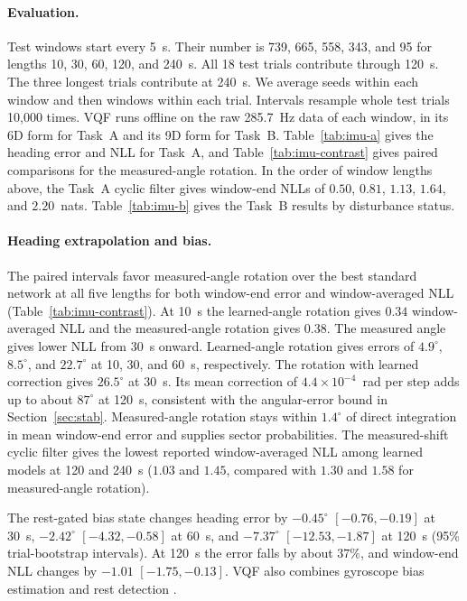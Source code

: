 \paragraph{Evaluation.}
Test windows start every 5~s. Their number is 739, 665, 558, 343, and 95 for
lengths 10, 30, 60, 120, and 240~s. All 18 test trials contribute through
120~s. The three longest trials contribute at 240~s. We average seeds within
each window and then windows within each trial. Intervals resample whole test
trials 10{,}000 times. VQF \citep{laidig2023vqf} runs offline on the raw 285.7~Hz
data of each window, in its 6D form for Task~A and its 9D form for Task~B.
Table~\ref{tab:imu-a} gives the heading error and NLL for Task~A, and
Table~\ref{tab:imu-contrast} gives paired comparisons for the measured-angle
rotation. In the order of window lengths above, the Task~A cyclic filter gives
window-end NLLs of $0.50$, $0.81$, $1.13$, $1.64$, and $2.20$~nats.
Table~\ref{tab:imu-b} gives the Task~B results by disturbance status.

\paragraph{Heading extrapolation and bias.}
The paired intervals favor measured-angle rotation over the best standard
network at all five lengths for both window-end error and window-averaged
NLL (Table~\ref{tab:imu-contrast}). At 10~s the learned-angle rotation gives
$0.34$ window-averaged NLL and the measured-angle rotation gives $0.38$.
The measured angle gives lower NLL from 30~s onward. Learned-angle
rotation gives errors of $4.9^\circ$, $8.5^\circ$, and $22.7^\circ$ at 10,
30, and 60~s, respectively. The rotation with learned correction gives
$26.5^\circ$ at 30~s. Its mean correction of $4.4\times10^{-4}$~rad per
step adds up to about $87^\circ$ at 120~s, consistent with the angular-error
bound in Section~\ref{sec:stab}. Measured-angle rotation stays within
$1.4^\circ$ of direct integration in mean window-end error and supplies
sector probabilities. The measured-shift cyclic filter gives the lowest
reported window-averaged NLL among learned models at 120 and 240~s
($1.03$ and $1.45$, compared with $1.30$ and $1.58$ for measured-angle
rotation).

The rest-gated bias state changes heading error by $-0.45^\circ$
$[-0.76,-0.19]$ at 30~s, $-2.42^\circ$ $[-4.32,-0.58]$ at 60~s, and
$-7.37^\circ$ $[-12.53,-1.87]$ at 120~s (95\% trial-bootstrap intervals).
At 120~s the error falls by about $37\%$, and window-end NLL changes by
$-1.01$ $[-1.75,-0.13]$. VQF also combines gyroscope bias estimation and
rest detection \citep{laidig2023vqf}.

